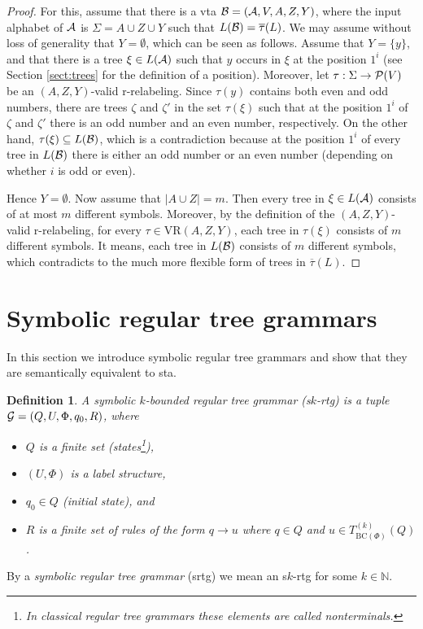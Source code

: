 \documentclass[10pt]{scrartcl}
\newtheorem{df}{Definition}[section]
\newcommand{\nat}{\mathbb{N}}
\newcommand{\BC}{\mathrm{BC}}
\newcommand{\VR}{\mathrm{VR}}
\newcommand{\A}{{\cal A}}
\newcommand{\B}{{\cal B}}
\newcommand{\G}{{\cal G}}
\def\ui#1{^{(#1)}}
\begin{document}
\begin{proof}
For this, assume that there is a vta ${\cal B} = ({\cal A},V,A,Z,Y)$, where the input alphabet of $\A$ is $\Sigma=A\cup Z\cup Y$ such that $L(\B)=\overline{\tau}(L)$. We may assume without loss of generality that $Y=\emptyset$, which can be seen as follows. Assume that $Y=\{y\}$, and that there is a tree $\xi \in L(\A)$ such that $y$ occurs in $\xi$ at the position $1^i$ (see Section \ref{sect:trees} for the definition of a position). 
Moreover, let $\tau: \Sigma \rightarrow {\cal P}(V)$ be an $(A,Z,Y)$-valid r-relabeling. Since $\tau(y)$ contains both even and odd numbers, there are trees $\zeta$ and $\zeta'$ in the set $\tau(\xi)$ such that at the position $1^i$ of $\zeta$ and $\zeta'$ there is an odd number and an even number, respectively. On the other hand, $\tau(\xi)\subseteq L(\B)$, which is a contradiction because at the  position $1^i$ of every tree in $L(\B)$ there is either an odd number or an even number (depending on whether $i$ is odd or even).

Hence $Y=\emptyset$. Now assume that $|A\cup Z| = m$. Then every tree in $\xi \in L(\A)$ consists of at most $m$ different symbols. Moreover, by the definition of the $(A,Z,Y)$-valid r-relabeling,
for every $\tau \in \mathrm{\VR}(A,Z,Y)$, each tree in $\tau(\xi)$ consists of $m$ different symbols. It means, each tree
in $L(\B)$ consists of $m$ different symbols, which  contradicts to the much more flexible form of trees in $\overline{\tau}(L)$.
\end{proof}






\section{Symbolic regular tree grammars} 

In this section we introduce symbolic regular tree grammars and show that they are semantically equivalent to sta. 

\begin{df} \rm A \emph{symbolic $k$-bounded  regular tree grammar} (s$k$-rtg) is a
  tuple $\G = (Q,U,\Phi,q_0,R)$, where
\begin{itemize}
\item $Q$ is a finite set (states\footnote{In classical regular tree
    grammars these elements are called nonterminals.}),
\item $(U,\Phi)$ is a label structure,
\item $q_0 \in Q$ (initial state), and 
\item $R$ is a finite set of rules of the form $q \rightarrow u$ where $q \in Q$ and $u \in T_{\BC(\Phi)}\ui k(Q)$. 
\end{itemize}
\end{df}
By a {\em symbolic regular tree grammar} (srtg) we mean an s$k$-rtg for some $k\in \nat$.
\end{document}

